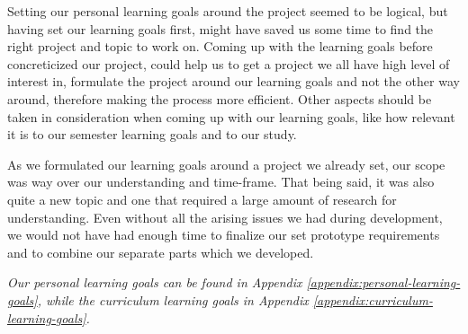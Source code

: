 Setting our personal learning goals around the project seemed to be logical, but having set our learning goals first, might have saved us some time to find the right project and topic to work on. Coming up with the learning goals before concreticized our project, could help us to get a project we all have high level of interest in, formulate the project around our learning goals and not the other way around, therefore making the process more efficient. Other aspects should be taken in consideration when coming up with our learning goals, like how relevant it is to our semester learning goals and to our study.

As we formulated our learning goals around a project we already set, our scope was way over our understanding and time-frame. That being said, it was also quite a new topic and one that required a large amount of research for understanding. Even without all the arising issues we had during development, we would not have had enough time to finalize our set prototype requirements and to combine our separate parts which we developed.

\textit{Our personal learning goals can be found in Appendix \ref{appendix:personal-learning-goals}, while the curriculum learning goals in Appendix \ref{appendix:curriculum-learning-goals}.}